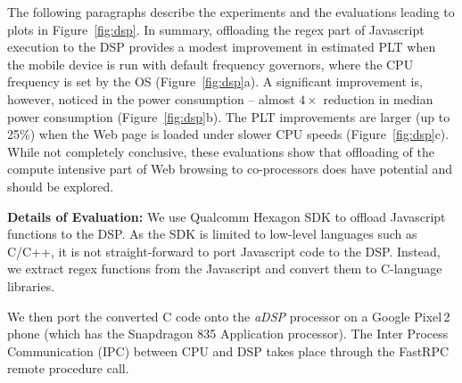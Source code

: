 The following paragraphs describe the experiments
and the evaluations leading to 
plots in Figure~\ref{fig:dsp}. In summary,
offloading the regex part of Javascript 
execution to the DSP provides a modest
improvement in estimated PLT when the mobile device is run with default frequency governors, where the CPU frequency is set by the OS (Figure~\ref{fig:dsp}a). 
A significant improvement is, however, noticed
in the power consumption -- almost $4\times$ reduction
in median power consumption (Figure~\ref{fig:dsp}b). The PLT improvements are larger (up to 25\%) when the Web page is loaded under slower CPU speeds (Figure~\ref{fig:dsp}c). While
not completely conclusive, these evaluations show that 
offloading of the compute intensive part of Web browsing 
to co-processors does have potential
and should be explored. 



\noindent\textbf{Details of Evaluation:}
We use Qualcomm Hexagon SDK \cite{hexqual2013qcom} to offload Javascript functions to the DSP.
As the SDK is limited to low-level languages such as C/C++, it is not straight-forward to port Javascript code to the DSP.
Instead, we extract regex functions from the Javascript
and convert them to C-language libraries. %

We then port the converted C code onto the \textit{aDSP} processor on a Google Pixel\,2 phone
(which has the Snapdragon 835 Application processor). 
The Inter Process Communication (IPC) between CPU and DSP takes place through 
the FastRPC remote procedure call.

